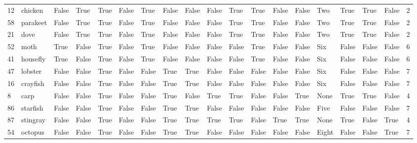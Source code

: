 \begin{tabular}{llllllllllllllllllr}
12  &     chicken &  False &      True &   True &  False &      True &    False &     False &    False &      True &      True &     False &  False &    Two &   True &      True &    False &           2 \\
58  &    parakeet &  False &      True &   True &  False &      True &    False &     False &    False &      True &      True &     False &  False &    Two &   True &      True &    False &           2 \\
21  &        dove &  False &      True &   True &  False &      True &    False &     False &    False &      True &      True &     False &  False &    Two &   True &      True &    False &           2 \\
52  &        moth &   True &     False &   True &  False &      True &    False &     False &    False &     False &      True &     False &  False &    Six &  False &     False &    False &           6 \\
41  &    housefly &   True &     False &   True &  False &      True &    False &     False &    False &     False &      True &     False &  False &    Six &  False &     False &    False &           6 \\
47  &     lobster &  False &     False &   True &  False &     False &     True &      True &    False &     False &     False &     False &  False &    Six &  False &     False &    False &           7 \\
16  &    crayfish &  False &     False &   True &  False &     False &     True &      True &    False &     False &     False &     False &  False &    Six &  False &     False &    False &           7 \\
8   &        carp &  False &     False &   True &  False &     False &     True &     False &     True &      True &     False &     False &   True &   None &   True &      True &    False &           4 \\
86  &    starfish &  False &     False &   True &  False &     False &     True &      True &    False &     False &     False &     False &  False &   Five &  False &     False &    False &           7 \\
87  &    stingray &  False &     False &   True &  False &     False &     True &      True &     True &      True &     False &      True &   True &   None &   True &     False &     True &           4 \\
54  &     octopus &  False &     False &   True &  False &     False &     True &      True &    False &     False &     False &     False &  False &  Eight &  False &     False &     True &           7 \\

\end{tabular}
